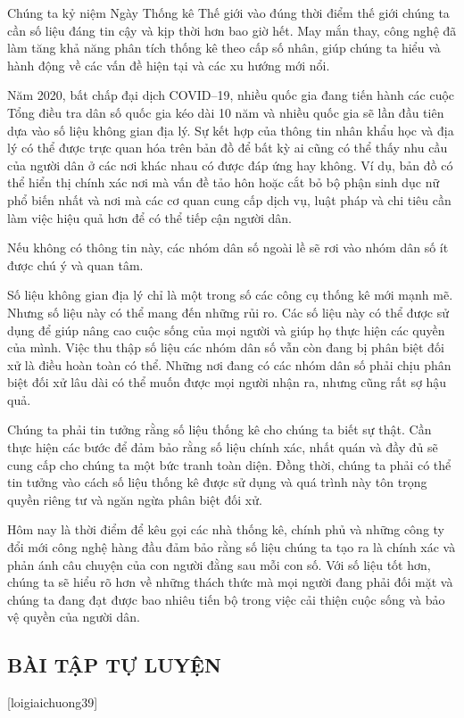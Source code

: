 Chúng ta kỷ niệm Ngày Thống kê Thế giới vào đúng thời điểm thế giới chúng ta cần số liệu đáng tin cậy và kịp thời hơn bao giờ hết. May mắn thay, công nghệ đã làm tăng khả năng phân tích thống kê theo cấp số nhân, giúp chúng ta hiểu và hành động về các vấn đề hiện tại và các xu hướng mới nổi.

Năm 2020, bất chấp đại dịch COVID--19, nhiều quốc gia đang tiến hành các cuộc Tổng điều tra dân số quốc gia kéo dài 10 năm và nhiều quốc gia sẽ lần đầu tiên dựa vào số liệu không gian địa lý. Sự kết hợp của thông tin nhân khẩu học và địa lý có thể được trực quan hóa trên bản đồ để bất kỳ ai cũng có thể thấy nhu cầu của người dân ở các nơi khác nhau có được đáp ứng hay không. Ví dụ, bản đồ có thể hiển thị chính xác nơi mà vấn đề tảo hôn hoặc cắt bỏ bộ phận sinh dục nữ phổ biến nhất và nơi mà các cơ quan cung cấp dịch vụ, luật pháp và chi tiêu cần làm việc hiệu quả hơn để có thể tiếp cận người dân.

Nếu không có thông tin này, các nhóm dân số ngoài lề sẽ rơi vào nhóm dân số ít được chú ý và quan tâm.

Số liệu không gian địa lý chỉ là một trong số các công cụ thống kê mới mạnh mẽ. Nhưng số liệu này có thể mang đến những rủi ro. Các số liệu này có thể được sử dụng để giúp nâng cao cuộc sống của mọi người và giúp họ thực hiện các quyền của mình. Việc thu thập số liệu các nhóm dân số vẫn còn đang bị phân biệt đối xử là điều hoàn toàn có thể. Những nơi đang có các nhóm dân số phải chịu phân biệt đối xử lâu dài có thể muốn được mọi người nhận ra, nhưng cũng rất sợ hậu quả.

Chúng ta phải tin tưởng rằng số liệu thống kê cho chúng ta biết sự thật. Cần thực hiện các bước để đảm bảo rằng số liệu chính xác, nhất quán và đầy đủ sẽ cung cấp cho chúng ta một bức tranh toàn diện. Đồng thời, chúng ta phải có thể tin tưởng vào cách số liệu thống kê được sử dụng và quá trình này tôn trọng quyền riêng tư và ngăn ngừa phân biệt đối xử.

Hôm nay là thời điểm để kêu gọi các nhà thống kê, chính phủ và những công ty đổi mới công nghệ hàng đầu đảm bảo rằng số liệu chúng ta tạo ra là chính xác và phản ánh câu chuyện của con người đằng sau mỗi con số. Với số liệu tốt hơn, chúng ta sẽ hiểu rõ hơn về những thách thức mà mọi người đang phải đối mặt và chúng ta đang đạt được bao nhiêu tiến bộ trong việc cải thiện cuộc sống và bảo vệ quyền của người dân.
\subsection{BÀI TẬP TỰ LUYỆN}
[loigiaichuong39]
